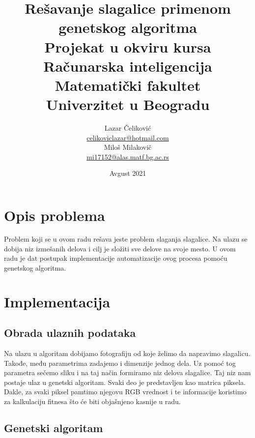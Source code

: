 \documentclass{article}
\title{%
  Rešavanje slagalice primenom genetskog algoritma \vspace{0.4cm} \\ 
  \large Projekat u okviru kursa Računarska inteligencija \\
  Matematički fakultet\\ Univerzitet u Beogradu \vspace*{0.5cm}}
\author{Lazar Čeliković \\
\href{mailto:celikoviclazar@hotmail.com}{celikoviclazar@hotmail.com} \\
Miloš Milakovič \\
\href{mailto:mi17152@alas.matf.bg.ac.rs}{mi17152@alas.matf.bg.ac.rs} \\
}
\date{\vspace*{1cm}Avgust 2021}
\begin{document}
  \maketitle
  \newpage
  \renewcommand*\contentsname{Sadržaj}
  \tableofcontents{}
  \newpage
\section{Opis problema}
Problem koji se u ovom radu rešava jeste problem slaganja slagalice. Na ulazu se dobija niz izmešanih delova i cilj je složiti sve delove na svoje mesto. U ovom radu je dat postupak implementacije automatizacije ovog procesa pomoću genetskog algoritma.

\section{Implementacija}

\subsection{Obrada ulaznih podataka}

Na ulazu u algoritam dobijamo fotografiju od koje želimo da napravimo slagalicu. Takođe, među parametrima zadajemo i dimenzije jednog dela. Uz pomoć tog parametra sečemo sliku i na taj način formiramo niz delova slagalice. Taj niz nam postaje ulaz u genetski algoritam.
Svaki deo je predstavljen kao matrica piksela. Dakle, za svaki piksel pamtimo njegovu RGB vrednost i te informacije koristimo za kalkulaciju fitnesa što će biti objašnjeno kasnije u radu.

\subsection{Genetski algoritam}
\end{document}

